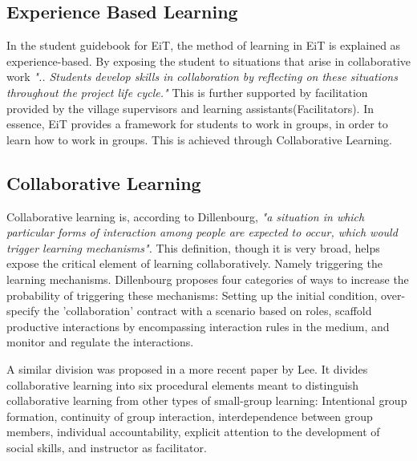 
    \subsection{Experience Based Learning}
        In the student guidebook for EiT\cite{EiTGuide}, the method of learning in EiT is explained as experience-based. By exposing the student to situations that arise in collaborative work \emph{"..  Students develop skills in collaboration by reflecting on these situations throughout the project life cycle."}\cite{EiTGuide} This is further supported by facilitation provided by the village supervisors and learning assistants(Facilitators).\cite{EiTGuide} In essence, EiT provides a framework for students to work in groups, in order to learn how to work in groups. This is achieved through Collaborative Learning.
        
    \subsection{Collaborative Learning}
        Collaborative learning is, according to Dillenbourg, \emph{"a situation in which particular forms of interaction among people are expected to occur, which would trigger learning mechanisms".} \cite{dillenbourg1999} This definition, though it is very broad, helps expose the critical element of learning collaboratively. Namely triggering the learning mechanisms. Dillenbourg proposes four categories of ways to increase the probability of triggering these mechanisms: Setting up the initial condition, over-specify the 'collaboration' contract with a scenario based on roles, scaffold productive interactions by encompassing interaction rules in the medium, and monitor and regulate the interactions. \cite{dillenbourg1999}
        
        A similar division was proposed in a more recent paper by Lee. It divides collaborative learning into six procedural elements meant to distinguish collaborative learning from other types of small-group learning: Intentional group formation, continuity of group interaction, interdependence between group members, individual accountability, explicit attention to the development of social skills, and instructor as facilitator. \cite{Lee2009}
        
